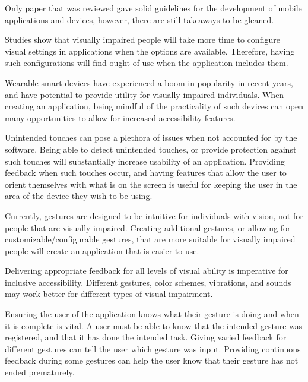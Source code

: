 \documentclass{article}
\begin{document}
\par Only paper that was reviewed gave solid guidelines for the development of mobile applications and devices, however, there are still takeaways to be gleaned. \cite{doi:10.1080/10447318.2017.1279827} 
\newline
\par Studies show that visually impaired people will take more time to configure visual settings in applications when the options are available. Therefore, having such configurations will find ought of use when the application includes them. 
\newline
\par Wearable smart devices have experienced a boom in popularity in recent years, and have potential to provide utility for visually impaired individuals. When creating an application, being mindful of the practicality of such devices can open many opportunities to allow for increased accessibility features.
\newline
\par Unintended touches can pose a plethora of issues when not accounted for by the software. Being able to detect unintended touches, or provide protection against such touches will substantially increase usability of an application. Providing feedback when such touches occur, and having features that allow the user to orient themselves with what is on the screen is useful for keeping the user in the area of the device they wish to be using. 
\newline
\par Currently, gestures are designed to be intuitive for individuals with vision, not for people that are visually impaired. Creating additional gestures, or allowing for customizable/configurable gestures, that are more suitable for visually impaired people will create an application that is easier to use.
\newline
\par Delivering appropriate feedback for all levels of visual ability is imperative for inclusive accessibility. Different gestures, color schemes, vibrations, and sounds may work better for different types of visual impairment. 
\newline
\par Ensuring the user of the application knows what their gesture is doing and when it is complete is vital. A user must be able to know that the intended gesture was registered, and that it has done the intended task. Giving varied feedback for different gestures can tell the user which gesture was input. Providing continuous feedback during some gestures can help the user know that their gesture has not ended prematurely.
\end{document}
